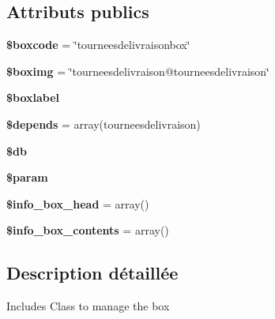\subsection*{Attributs publics}
\begin{DoxyCompactItemize}
\item 
\mbox{\label{classtourneesdelivraisonwidget1_a3325298cb22a9aeeb6f2ecd5dde17699}} 
{\bfseries \$boxcode} = \char`\"{}tourneesdelivraisonbox\char`\"{}
\item 
\mbox{\label{classtourneesdelivraisonwidget1_a000821ed130e1bb54f2a4ea40f43d2a9}} 
{\bfseries \$boximg} = \char`\"{}tourneesdelivraison@tourneesdelivraison\char`\"{}
\item 
\mbox{\label{classtourneesdelivraisonwidget1_a0e075a78b97d55c7a0d9f14f9f83c219}} 
{\bfseries \$boxlabel}
\item 
\mbox{\label{classtourneesdelivraisonwidget1_a1576c326a6fb91de4bbf791344b2e8e0}} 
{\bfseries \$depends} = array(\textquotesingle{}tourneesdelivraison\textquotesingle{})
\item 
\mbox{\label{classtourneesdelivraisonwidget1_a9a9d573f1676b49b22c26d63a2d0c0b9}} 
{\bfseries \$db}
\item 
\mbox{\label{classtourneesdelivraisonwidget1_ae0cd79dd23cbe7be68049d3a4529d1aa}} 
{\bfseries \$param}
\item 
\mbox{\label{classtourneesdelivraisonwidget1_a710b7a914600bd3abc96e4b5fb6f4f7c}} 
{\bfseries \$info\+\_\+box\+\_\+head} = array()
\item 
\mbox{\label{classtourneesdelivraisonwidget1_a6b9e50482f7d6bb135e557922a2f7675}} 
{\bfseries \$info\+\_\+box\+\_\+contents} = array()
\end{DoxyCompactItemize}


\subsection{Description détaillée}
Includes Class to manage the box

